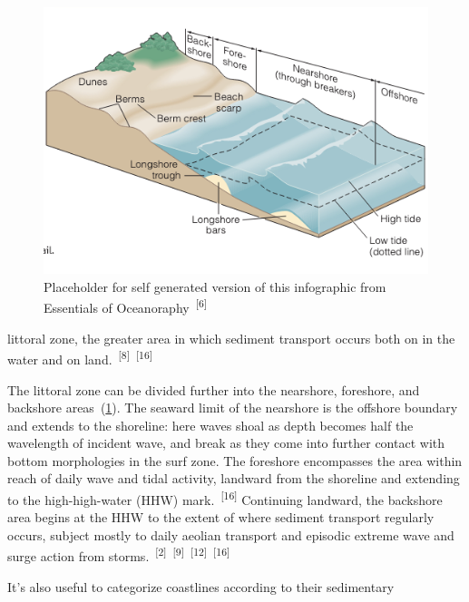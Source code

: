 \documentclass{article}
\begin{document}
\newpage
{}
\fancyfoot[C]{\thepage} 
\thispagestyle{fancy}
\begin{figure}
    \centering
    \includegraphics[width=1.0\linewidth]{images/coastal-sub-zones.png}
    \caption{Placeholder for self generated version of this infographic from Essentials of Oceanoraphy~\textsuperscript{[6]}}
    \label{figure5}
\end{figure}

\par{\noindent littoral zone, the greater area in which sediment transport occurs both on in the water and on land.~\textsuperscript{[8]}~\textsuperscript{[16]}}

\par{The littoral zone can be divided further into the nearshore, foreshore, and backshore areas~(\cref{figure5}). The seaward limit of the nearshore is the offshore boundary and extends to the shoreline: here waves shoal as depth becomes half the wavelength of incident wave, and break as they come into further contact with bottom morphologies in the surf zone. The foreshore encompasses the area within reach of daily wave and tidal activity, landward from the shoreline and extending to the high-high-water (HHW) mark.~\textsuperscript{[16]} Continuing landward, the backshore area begins at the HHW to the extent of where sediment transport regularly occurs, subject mostly to daily aeolian transport and episodic extreme wave and surge action from storms.~\textsuperscript{[2]}~\textsuperscript{[9]}~\textsuperscript{[12]}~\textsuperscript{[16]}}

\par{It's also useful to categorize coastlines according to their sedimentary}
\end{document}
